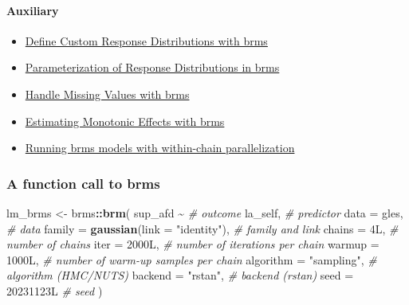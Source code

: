 \documentclass[
  11pt,
]{article}
\newenvironment{Shaded}{\begin{snugshade}}{\end{snugshade}}
\newcommand{\AttributeTok}[1]{\textcolor[rgb]{0.13,0.29,0.53}{#1}}
\newcommand{\CommentTok}[1]{\textcolor[rgb]{0.56,0.35,0.01}{\textit{#1}}}
\newcommand{\FunctionTok}[1]{\textcolor[rgb]{0.13,0.29,0.53}{\textbf{#1}}}
\newcommand{\NormalTok}[1]{#1}
\newcommand{\OtherTok}[1]{\textcolor[rgb]{0.56,0.35,0.01}{#1}}
\newcommand{\SpecialCharTok}[1]{\textcolor[rgb]{0.81,0.36,0.00}{\textbf{#1}}}
\newcommand{\StringTok}[1]{\textcolor[rgb]{0.31,0.60,0.02}{#1}}
\providecommand{\tightlist}{%
  \setlength{\itemsep}{0pt}\setlength{\parskip}{0pt}}
\begin{document}
\hypertarget{auxiliary}{%
\paragraph{Auxiliary}\label{auxiliary}}

\begin{itemize}
\tightlist
\item
  \href{https://paul-buerkner.github.io/brms/articles/brms_customfamilies.html}{Define Custom Response Distributions with brms}
\item
  \href{https://paul-buerkner.github.io/brms/articles/brms_families.html}{Parameterization of Response Distributions in brms}
\item
  \href{https://paul-buerkner.github.io/brms/articles/brms_missings.html}{Handle Missing Values with brms}
\item
  \href{https://paul-buerkner.github.io/brms/articles/brms_monotonic.html}{Estimating Monotonic Effects with brms}
\item
  \href{https://paul-buerkner.github.io/brms/articles/brms_threading.html}{Running brms models with within-chain parallelization}
\end{itemize}

\hypertarget{a-function-call-to-brms}{%
\subsubsection{A function call to brms}\label{a-function-call-to-brms}}

\begin{Shaded}
\begin{Highlighting}[]
\NormalTok{lm\_brms }\OtherTok{\textless{}{-}}\NormalTok{ brms}\SpecialCharTok{::}\FunctionTok{brm}\NormalTok{(}
\NormalTok{  sup\_afd }\SpecialCharTok{\textasciitilde{}}                              \CommentTok{\# outcome}
\NormalTok{    la\_self,                             }\CommentTok{\# predictor}
  \AttributeTok{data =}\NormalTok{ gles,                           }\CommentTok{\# data}
  \AttributeTok{family =} \FunctionTok{gaussian}\NormalTok{(}\AttributeTok{link =} \StringTok{"identity"}\NormalTok{),  }\CommentTok{\# family and link}
  \AttributeTok{chains =}\NormalTok{ 4L,                           }\CommentTok{\# number of chains}
  \AttributeTok{iter =}\NormalTok{ 2000L,                          }\CommentTok{\# number of iterations per chain}
  \AttributeTok{warmup =}\NormalTok{ 1000L,                        }\CommentTok{\# number of warm{-}up samples per chain}
  \AttributeTok{algorithm =} \StringTok{"sampling"}\NormalTok{,                }\CommentTok{\# algorithm (HMC/NUTS)}
  \AttributeTok{backend =} \StringTok{"rstan"}\NormalTok{,                     }\CommentTok{\# backend (rstan)}
  \AttributeTok{seed =}\NormalTok{ 20231123L                       }\CommentTok{\# seed}
\NormalTok{)}
\end{Highlighting}
\end{Shaded}
\end{document}
